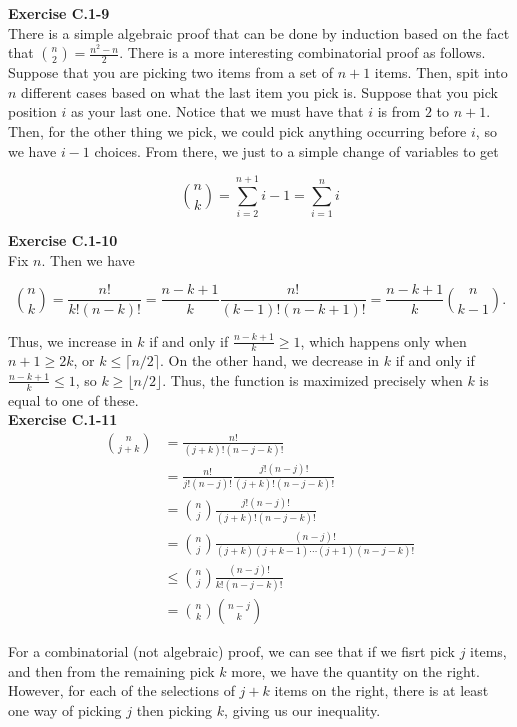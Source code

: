 \documentclass{article}
\begin{document}
\noindent\textbf{Exercise C.1-9}\\

There is a simple algebraic proof that can be done by induction based on the fact that $\binom{n}{2} = \frac{n^2-n}{2}$. There is a more interesting combinatorial proof as follows. Suppose that you are picking two items from a set of $n+1$ items. Then, spit into $n$ different cases based on what the last item you pick is. Suppose that you pick position $i$ as your last one. Notice that we must have that $i$ is from $2$ to $n+1$. Then, for the other thing we pick, we could pick anything occurring before $i$, so we have $i-1$ choices. From there, we just to a simple change of variables to get

\[
\binom{n}{k} = \sum_{i=2}^{n+1} i-1 = \sum_{i=1}^{n} i
\]

\noindent\textbf{Exercise C.1-10}\\

Fix $n$.  Then we have 

\[{n \choose k} = \frac{n!}{k!(n-k)!} = \frac{n-k+1}{k} \frac{n!}{(k-1)!(n-k+1)!} = \frac{n-k+1}{k}{n \choose k-1}.\]

Thus, we increase in $k$ if and only if $\frac{n-k+1}{k} \geq 1$, which happens only when $n+1 \geq 2k$, or $k \leq \lceil n/2 \rceil$.  On the other hand, we decrease in $k$ if and only if $\frac{n-k+1}{k} \leq 1$, so $k \geq \lfloor n/2 \rfloor$.  Thus, the function is maximized precisely when $k$ is equal to one of these. \\

\noindent\textbf{Exercise C.1-11}\\

\begin{align*}
\binom{n}{j+k} &= \frac{n!}{(j+k)!(n-j-k)!}\\
&=\frac{n!}{j! (n-j)!} \frac{j! (n-j)!}{(j+k)! (n-j-k)!}\\
&=\binom{n}{j}\frac{j! (n-j)!}{(j+k)! (n-j-k)!}\\
&= \binom{n}{j} \frac{(n-j)!}{(j+k)(j+k-1)\cdots (j+1) (n-j-k)!}\\
&\le\binom{n}{j} \frac{(n-j)!}{k! (n-j-k)!}\\
&=\binom{n}{k}\binom{n-j}{k}
\end{align*}

For a combinatorial (not algebraic) proof, we can see that if we fisrt pick $j$ items, and then from the remaining pick $k$ more, we have the quantity on the right. However, for each of the selections of $j+k$ items on the right, there is at least one way of picking $j$ then picking $k$, giving us our inequality.
\end{document}
